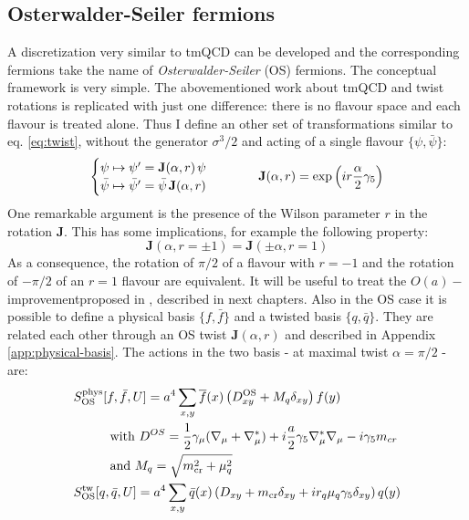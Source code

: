 \documentclass[english, LaM, oneside, noexaminfo]{sapthesis}
\newcommand{\oait}{$O(a)-$improvement}
\begin{document}
\subsection{Osterwalder-Seiler fermions}\label{sec:OS-regularization}
\noindent
A discretization very similar to tmQCD can be developed and the corresponding fermions take the name of {\it Osterwalder-Seiler} (OS) fermions.
The conceptual framework is very simple.
The abovementioned work about tmQCD and twist rotations is replicated with just one difference: there is no flavour space and each flavour is treated alone.
Thus I define an other set of transformations similar to eq. \ref{eq:twist}, without the generator $\sigma^3/2$ and acting of a single flavour $\{\psi,\bar \psi\}$:
\begin{equation}\label{eq:twistOS}
    \begin{cases}
        \psi \mapsto \psi' = \mathbf{J}(\alpha,r) \hspace*{0.5mm} \psi \\
        \bar \psi \mapsto \bar \psi' = \bar \psi \hspace*{0.5mm} \mathbf{J}(\alpha,r) 
    \end{cases}
    \hspace*{1cm}
    \mathbf{J}(\alpha,r) = \text{exp}\left(i r \frac{\alpha}{2} \gamma_5\right)
\end{equation}
One remarkable argument is the presence of the Wilson parameter $r$ in the rotation $\mathbf{J}$.
This has some implications, for example the following property:
\begin{equation*}
    \mathbf{J}(\alpha, r=\pm 1) = \mathbf{J}(\pm\alpha, r= 1)
\end{equation*}
As a consequence, the rotation of $\pi/2$ of a flavour with $r=-1$ and the rotation of $-\pi/2$ of an $r=1$ flavour are equivalent.
It will be useful to treat the \oait\space proposed in \cite{FR2}, described in next chapters.
\newline
Also in the OS case it is possible to define a physical basis $\{f,\bar f\}$ and a twisted basis $\{q,\bar q\}$.
They are related each other through an OS twist $\mathbf{J}(\alpha, r)$ and described in Appendix \ref{app:physical-basis}.
The actions in the two basis - at maximal twist $\alpha = \pi/2$ - are:
\begin{equation*}
    \begin{aligned}
        & S^\text{phys}_\text{OS} [f,\bar{f},U] = a^4 \sum_{x,y} \overline{f} (x) \left( D_{xy}^\text{OS} + M_q \delta_{xy} \right) f (y) \\
        & \hspace*{1cm}\text{with } D^{OS} = \frac{1}{2}\gamma_\mu(\nabla_\mu+\nabla_\mu^*) + i\frac{a}{2}\gamma_5\nabla_\mu^*\nabla_\mu -i\gamma_5 m_{cr} \\
        & \hspace*{1cm}\text{and  } M_q = \sqrt{m_\text{cr}^2 + \mu_q^2}\\
        & S^\text{tw}_\text{OS}[q,\bar q, U] = a^4 \sum_{x,y} \bar q(x) \left( D_{xy} + m_\text{cr} \delta_{xy} + i r_q \mu_q\gamma_5 \delta_{xy} \right) q (y)  \\
    \end{aligned}
\end{equation*}
\end{document}
